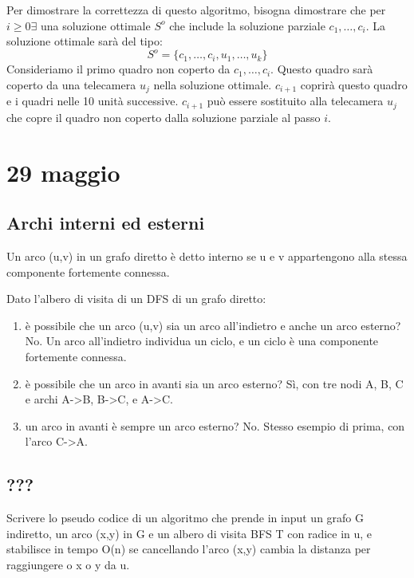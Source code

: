 Per dimostrare la correttezza di questo algoritmo, bisogna dimostrare che per $i \ge 0 \exists$ una soluzione ottimale $S^{o}$ che include la soluzione parziale $c_1, \ldots, c_i$. La soluzione ottimale sar\`a del tipo:
\[
S^{o} = \{ c_1, \ldots, c_i, u_1, \ldots, u_k \}
\]
Consideriamo il primo quadro non coperto da $c_1, \ldots, c_i$. Questo quadro sar\`a coperto da una telecamera $u_j$ nella soluzione ottimale. $c_{i+1}$ coprir\`a questo quadro e i quadri nelle 10 unit\`a successive. $c_{i+1}$ pu\`o essere sostituito alla telecamera $u_j$ che copre il quadro non coperto dalla soluzione parziale al passo $i$.

\clearpage

\section{29 maggio}

\subsection{Archi interni ed esterni}

Un arco (u,v) in un grafo diretto \`e detto interno se u e v appartengono alla stessa componente fortemente connessa.

Dato l'albero di visita di un DFS di un grafo diretto:
\begin{enumerate}
    \item \`e possibile che un arco (u,v) sia un arco all'indietro e anche un arco esterno? No. Un arco all'indietro individua un ciclo, e un ciclo \`e una componente fortemente connessa.
    \item \`e possibile che un arco in avanti sia un arco esterno? S\`i, con tre nodi A, B, C e archi A->B, B->C, e A->C.
    \item un arco in avanti \`e sempre un arco esterno? No. Stesso esempio di prima, con l'arco C->A.
\end{enumerate}

\clearpage

\subsection{???}

Scrivere lo pseudo codice di un algoritmo che prende in input un grafo G indiretto, un arco (x,y) in G e un albero di visita BFS T con radice in u, e stabilisce in tempo O(n) se cancellando l'arco (x,y) cambia la distanza per raggiungere o x o y da u.

